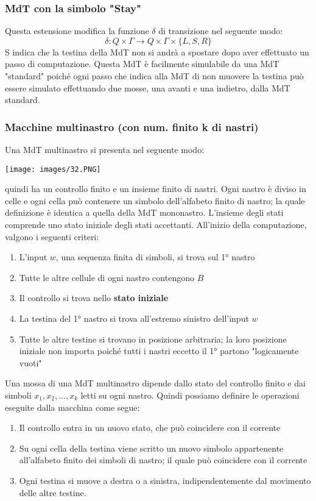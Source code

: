\documentclass[12pt]{article}
\begin{document}
\subsubsection{MdT con la simbolo "Stay"}
Questa estensione modifica la funzione $\delta$ di transizione nel seguente modo:
$$\delta: Q \times \Gamma \rightarrow Q \times \Gamma \times \{L, S, R\}$$
S indica che la testina della MdT non si andrà a spostare dopo aver effettuato un passo di computazione. Questa MdT è facilmente simulabile da una MdT "standard" poiché ogni passo che indica alla MdT di non muovere la testina può essere simulato effettuando due mosse, una avanti e una indietro, dalla MdT standard.
\subsubsection{Macchine multinastro (con num. finito k di nastri)}
Una MdT multinastro si presenta nel seguente modo:
\begin{center}
    \texttt{[image: images/32.PNG]}
\end{center}
quindi ha un controllo finito e un insieme finito di nastri. Ogni nastro è diviso in celle e ogni cella può contenere un simbolo dell'alfabeto finito di nastro; la quale definizione è identica a quella della MdT mononastro.  L'insieme degli stati comprende uno stato iniziale degli stati accettanti. All'inizio della computazione, valgono i seguenti criteri:
\begin{enumerate}
    \item L'input $w$, una sequenza finita di simboli, si trova sul 1° nastro
    \item Tutte le altre cellule di ogni nastro contengono $B$
    \item Il controllo si trova nello \textbf{stato iniziale}
    \item La testina del 1° nastro si trova all'estremo sinistro dell'input $w$
    \item Tutte le altre testine si trovano in posizione arbitraria; la loro posizione iniziale non importa poiché tutti i nastri eccetto il 1° partono "logicamente vuoti"
\end{enumerate}
Una mossa di una MdT multinastro dipende dallo stato del controllo finito e dai simboli $x_1, x_2, ..., x_k$ letti su ogni nastro. Quindi possiamo definire le operazioni eseguite dalla macchina come segue:
\begin{enumerate}
    \item Il controllo entra in un nuovo stato, che può coincidere con il corrente
    \item Su ogni cella della testina viene scritto un nuovo simbolo appartenente all'alfabeto finito dei simboli di nastro; il quale può coincidere con il corrente
    \item Ogni testina si muove a destra o a sinistra, indipendentemente dal movimento delle altre testine.
\end{enumerate}
\end{document}
